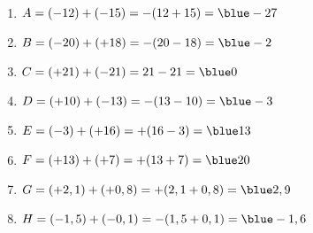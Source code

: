    \ \\ [-5mm]
   \begin{enumerate}
      \item $A =(-12)+(-15) =-(12+15) ={\blue -27}$ \smallskip
      \item $B =(-20)+(+18) =-(20-18) ={\blue -2}$ \smallskip
      \item $C =(+21)+(-21) =21-21 ={\blue 0}$ \smallskip
      \item $D =(+10)+(-13) =-(13-10) ={\blue -3}$ \smallskip
      \item $E =(-3)+(+16) =+(16-3) ={\blue 13}$ \smallskip
      \item $F =(+13)+(+7) =+(13+7) ={\blue 20}$ \smallskip
      \item $G =(+2,1)+(+0,8) =+(2,1+0,8) ={\blue 2,9}$ \smallskip
      \item $H =(-1,5)+(-0,1) =-(1,5+0,1) ={\blue -1,6}$
   \end{enumerate}
